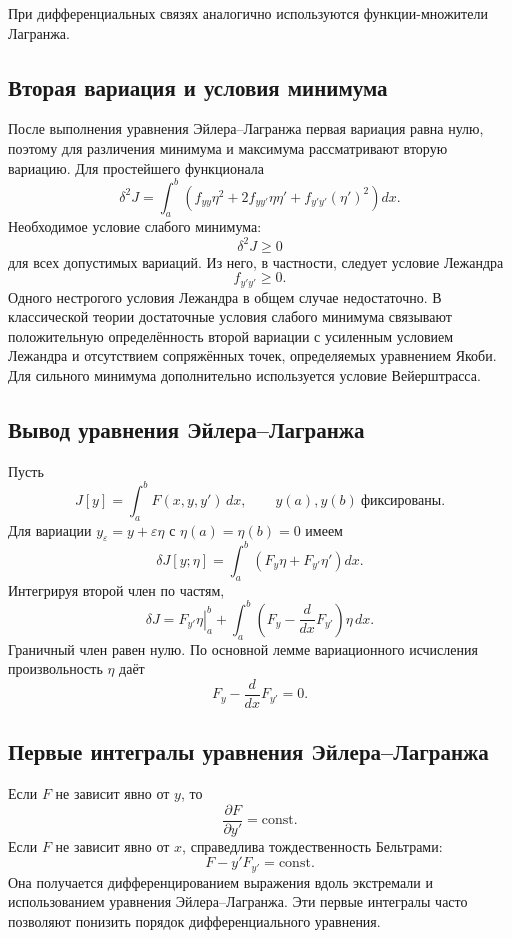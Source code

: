 При дифференциальных связях аналогично используются функции-множители
Лагранжа.

\subsection{Вторая вариация и условия минимума}

После выполнения уравнения Эйлера--Лагранжа первая вариация равна нулю, поэтому
для различения минимума и максимума рассматривают вторую вариацию. Для
простейшего функционала
\[
    \delta^2J=\int_a^b
    \left(
        f_{yy}\eta^2
        +2f_{yy'}\eta\eta'
        +f_{y'y'}(\eta')^2
    \right)dx.
\]
Необходимое условие слабого минимума:
\[
    \delta^2J\geq0
\]
для всех допустимых вариаций. Из него, в частности, следует условие Лежандра
\[
    f_{y'y'}\geq0.
\]
Одного нестрогого условия Лежандра в общем случае недостаточно. В классической
теории достаточные условия слабого минимума связывают положительную
определённость второй вариации с усиленным условием Лежандра и отсутствием
сопряжённых точек, определяемых уравнением Якоби. Для сильного минимума
дополнительно используется условие Вейерштрасса.


\subsection{Вывод уравнения Эйлера--Лагранжа}

Пусть
\[
J[y]=\int_a^b F(x,y,y')\,dx,
\qquad y(a),y(b)\ \text{фиксированы}.
\]
Для вариации $y_\varepsilon=y+\varepsilon\eta$ с
$\eta(a)=\eta(b)=0$ имеем
\[
\delta J[y;\eta]
=\int_a^b\left(F_y\eta+F_{y'}\eta'\right)dx.
\]
Интегрируя второй член по частям,
\[
\delta J=
\left.F_{y'}\eta\right|_a^b
+\int_a^b
\left(F_y-\frac d{dx}F_{y'}\right)\eta\,dx.
\]
Граничный член равен нулю. По основной лемме вариационного исчисления произвольность
$\eta$ даёт
\[
    \boxed{F_y-\frac d{dx}F_{y'}=0.}
\]

\subsection{Первые интегралы уравнения Эйлера--Лагранжа}

Если $F$ не зависит явно от $y$, то
\[
    \frac{\partial F}{\partial y'}=\mathrm{const}.
\]
Если $F$ не зависит явно от $x$, справедлива тождественность Бельтрами:
\[
    F-y'F_{y'}=\mathrm{const}.
\]
Она получается дифференцированием выражения вдоль экстремали и использованием
уравнения Эйлера--Лагранжа. Эти первые интегралы часто позволяют понизить порядок
дифференциального уравнения.

